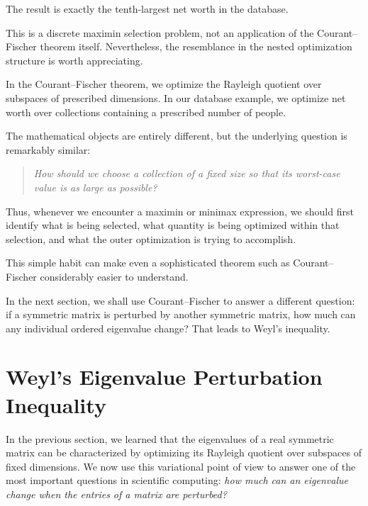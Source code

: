 \documentclass[14pt,letterpaper]{article}
\theoremstyle{plain}
\theoremstyle{definition}
\theoremstyle{remark}
\begin{document}
The result is exactly the tenth-largest
net worth in the database.

This is a discrete maximin selection problem,
not an application of the Courant--Fischer
theorem itself. Nevertheless, the resemblance
in the nested optimization structure is
worth appreciating.

In the Courant--Fischer theorem, we optimize
the Rayleigh quotient over subspaces of
prescribed dimensions. In our database
example, we optimize net worth over
collections containing a prescribed
number of people.

The mathematical objects are entirely
different, but the underlying question
is remarkably similar:

\begin{quote}
\emph{
How should we choose a collection of
a fixed size so that its worst-case
value is as large as possible?
}
\end{quote}

Thus, whenever we encounter a maximin
or minimax expression, we should first
identify what is being selected, what
quantity is being optimized within that
selection, and what the outer optimization
is trying to accomplish.

This simple habit can make even a
sophisticated theorem such as
Courant--Fischer considerably easier
to understand.


In the next section, we shall use Courant--Fischer
to answer a different question: if a symmetric
matrix is perturbed by another symmetric matrix,
how much can any individual ordered eigenvalue change?
That leads to Weyl's inequality.



\section{Weyl's Eigenvalue Perturbation Inequality}
\label{sec:weyl}

In the previous section, we learned that the eigenvalues
of a real symmetric matrix can be characterized by
optimizing its Rayleigh quotient over subspaces of fixed
dimensions. We now use this variational point of view to
answer one of the most important questions in scientific
computing: \emph{how much can an eigenvalue change when
the entries of a matrix are perturbed?}
\end{document}
